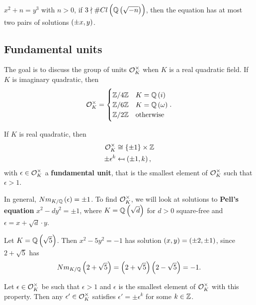 \begin{remark*}
$ x^2 + n = y^3 $ with $ n > 0 $, if $ 3 \nmid \#Cl\br{\Q\br{\sqrt{-n}}} $, then the equation has at most two pairs of solutions $ \br{\pm x, y} $.
\end{remark*}

\pagebreak

\subsection{Fundamental units}


The goal is to discuss the group of units $ \mathcal{O}_K^\times $ when $ K $ is a real quadratic field. If $ K $ is imaginary quadratic, then
$$ \OO_K^\times =
\begin{cases}
\Z / 4\Z & K = \Q\br{i} \\
\Z / 6\Z & K = \Q\br{\omega} \\
\Z / 2\Z & \text{otherwise}
\end{cases}.
$$

\begin{theorem}
If $ K $ is real quadratic, then
\begin{align*}
\OO_K^\times & \cong \cbr{\pm 1} \times \Z \\
\pm\epsilon^k & \mapsfrom \br{\pm 1, k},
\end{align*}
with $ \epsilon \in \mathcal{O}_K^\times $ a \textbf{fundamental unit}, that is the smallest element of $ \mathcal{O}_K^\times $ such that $ \epsilon > 1 $.
\end{theorem}

In general, $ Nm_{K / \Q}\br{\epsilon} = \pm 1 $. To find $ \mathcal{O}_K^\times $, we will look at solutions to \textbf{Pell's equation} $ x^2 - dy^2 = \pm 1 $, where $ K = \Q\br{\sqrt{d}} $ for $ d > 0 $ square-free and $ \epsilon = x + \sqrt{d} \cdot y $.

\begin{example*}
Let $ K = \Q\br{\sqrt{5}} $. Then $ x^2 - 5y^2 = -1 $ has solution $ \br{x, y} = \br{\pm 2, \pm 1} $, since $ 2 + \sqrt{5} $ has
$$ Nm_{K / \Q}\br{2 + \sqrt{5}} = \br{2 + \sqrt{5}}\br{2 - \sqrt{5}} = -1. $$
\end{example*}

\begin{lemma}
Let $ \epsilon \in \mathcal{O}_K^\times $ be such that $ \epsilon > 1 $ and $ \epsilon $ is the smallest element of $ \mathcal{O}_K^\times $ with this property. Then any $ \epsilon' \in \mathcal{O}_K^\times $ satisfies $ \epsilon' = \pm\epsilon^k $ for some $ k \in \mathbb{Z} $.
\end{lemma}

